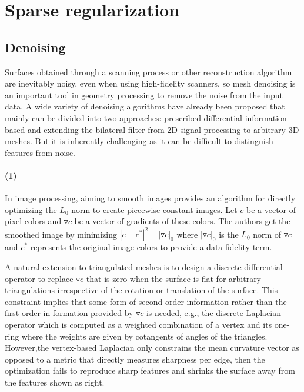 \label{sec:SRpart1}

\section{Sparse regularization}

\subsection{Denoising} Surfaces obtained through a scanning process or other reconstruction algorithm are inevitably noisy, even when using high-fidelity scanners, so mesh denoising is an important tool in geometry processing to remove the noise from the input data. A wide variety of denoising algorithms have already been proposed that mainly can be divided into two approaches: prescribed differential information based and extending the bilateral filter from 2D signal processing to arbitrary 3D meshes. But it is inherently challenging as it can be difficult to distinguish features from noise.

\paragraph{(1)} In image processing, \cite{xu2011image} aiming to smooth images provides an algorithm for directly optimizing the $L_0$ norm to create piecewise constant images. Let $c$ be a vector of pixel colors and $\triangledown c$ be a vector of gradients of these colors. The authors get the smoothed image by minimizing $|c-c^{*}|^2+|\triangledown c|_0$ where $|\triangledown c|_0$ is the $L_0$ norm of $\triangledown c$ and $c^{*}$ represents the original image colors to provide a data fidelity term.

A natural extension to triangulated meshes is to design a discrete differential operator to replace $\triangledown c$ that is zero when the surface is flat for arbitrary triangulations irrespective of the rotation or translation of the surface. 
This constraint implies that some form of second order information rather than the first order in formation provided by $\triangledown c$ is needed, e.g.,  the discrete Laplacian operator\cite{pinkall1993computing} which is computed as a weighted combination of a vertex and its one-ring where the weights are given by cotangents of angles of the triangles.
However,the vertex-based Laplacian only constrains the mean curvature vector as opposed to a metric that directly measures sharpness per edge, then the optimization fails to reproduce sharp features and shrinks the surface away from the features shown as right.

